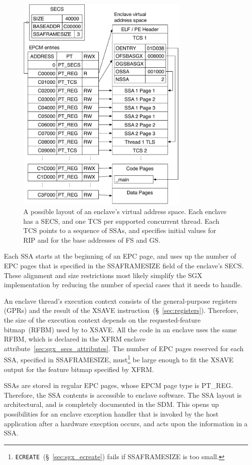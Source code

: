 \begin{figure}[hbt]
  \centering
  \includegraphics[width=85mm]{figures/sgx_enclave_layout.pdf}
  \caption{
    A possible layout of an enclave's virtual address space. Each enclave has a
    SECS, and one TCS per supported concurrent thread. Each TCS points to a
    sequence of SSAs, and specifies initial values for RIP and for the base
    addresses of FS and GS.
  }
  \label{fig:sgx_enclave_layout}
\end{figure}

Each SSA starts at the beginning of an EPC page, and uses up the number of EPC
pages that is specified in the SSAFRAMESIZE field of the enclave's SECS. These
alignment and size restrictions most likely simplify the SGX implementation by
reducing the number of special cases that it needs to handle.


An enclave thread's execution context consists of the general-purpose registers
(GPRs) and the result of the XSAVE instruction~(\S~\ref{sec:registers}).
Therefore, the size of the execution context depends on the requested-feature
bitmap~(RFBM) used by to XSAVE. All the code in an enclave uses the same RFBM,
which is declared in the XFRM enclave attribute~\ref{sec:sgx_secs_attributes}.
The number of EPC pages reserved for each SSA, specified in SSAFRAMESIZE,
must\footnote{\texttt{ECREATE}~(\S~\ref{sec:sgx_ecreate}) fails if SSAFRAMESIZE
is too small.} be large enough to fit the XSAVE output for the feature bitmap
specified by XFRM.

SSAs are stored in regular EPC pages, whose EPCM page type is PT\_REG.
Therefore, the SSA contents is accessible to enclave software. The SSA layout
is architectural, and is completely documented in the SDM. This opens up
possibilities for an enclave exception handler that is invoked by the host
application after a hardware execption occurs, and acts upon the information in
a SSA.
